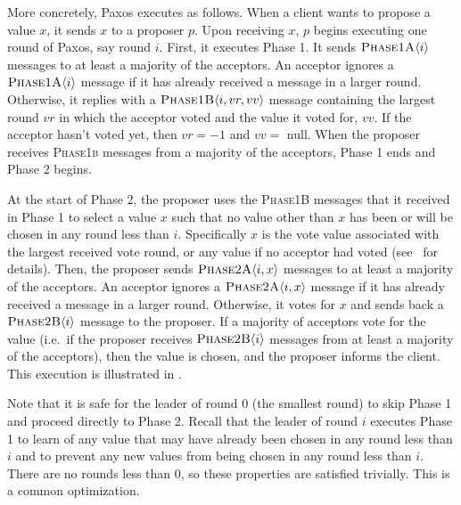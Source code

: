 More concretely, Paxos executes as follows. When a client wants to propose a
value $x$, it sends $x$ to a proposer $p$. Upon receiving $x$, $p$ begins
executing one round of Paxos, say round $i$. First, it executes Phase 1. It
sends $\textsc{Phase1A}\langle{i}\rangle$ messages to at least a majority of the acceptors. An
acceptor ignores a $\textsc{Phase1A}\langle{i}\rangle$ message if it has already received a message
in a larger round. Otherwise, it replies with a $\textsc{Phase1B}\langle{i, vr, vv}\rangle$ message
containing the largest round $vr$ in which the acceptor voted and the value it
voted for, $vv$. If the acceptor hasn't voted yet, then $vr = -1$ and $vv = $
\textsf{null}. When the proposer receives \textsc{Phase1b} messages from a
majority of the acceptors, Phase 1 ends and Phase 2 begins.

%

At the start of Phase 2, the proposer uses the \textsc{Phase1B} messages that
it received in Phase 1 to select a value $x$ such that no value other than $x$
has been or will be chosen in any round less than $i$. Specifically $x$ is the
vote value associated with the largest received vote round, or any value if no
acceptor had voted (see~\cite{lamport2001paxos} for details). Then, the
proposer sends $\textsc{Phase2A}\langle{i, x}\rangle$ messages to at least a majority of the
acceptors. An acceptor ignores a $\textsc{Phase2A}\langle{i, x}\rangle$ message if it has already
received a message in a larger round. Otherwise, it votes for $x$ and sends
back a $\textsc{Phase2B}\langle{i}\rangle$ message to the proposer. If a majority of acceptors vote
for the value (i.e.\ if the proposer receives $\textsc{Phase2B}\langle{i}\rangle$ messages from at
least a majority of the acceptors), then the value is chosen, and the proposer
informs the client. This execution is illustrated in
.

Note that it is safe for the leader of round $0$ (the smallest round) to skip
Phase 1 and proceed directly to Phase 2. Recall that the leader of round $i$
executes Phase 1 to learn of any value that may have already been chosen in any
round less than $i$ and to prevent any new values from being chosen in any
round less than $i$. There are no rounds less than $0$, so these properties are
satisfied trivially. This is a common optimization.


